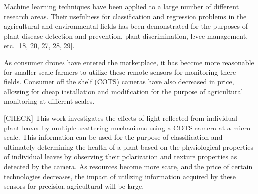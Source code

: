 Machine learning techniques have been applied to a large number of different research areas.  Their usefulness for classification and regression problems in the agricultural and environmental fields has been demonstrated for the purposes of plant disease detection and prevention, plant discrimination, levee management, etc. [18, 20, 27, 28, 29].

As consumer drones have entered the marketplace, it has become more reasonable for smaller scale farmers to utilize these remote sensors for monitoring there fields.  Consumer off the shelf (COTS) cameras have also decreased in price, allowing for cheap installation and modification for the purpose of agricultural monitoring at different scales.

[CHECK] This work investigates the effects of light reflected from individual plant leaves by multiple scattering mechanisms using a COTS camera at a micro scale.  This information can be used for the purpose of classification and ultimately determining the health of a plant based on the physiological properties of individual leaves by observing their polarization and texture properties as detected by the camera.  As resources become more scare, and the price of certain technologies decreases, the impact of utilizing information acquired by these sensors for precision agricultural will be large.
